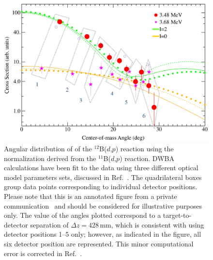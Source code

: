 \begin{figure}[p]
\centering
\includegraphics[height=0.4\textheight,width=\columnwidth,keepaspectratio]{../More_Figures/b13.eps}%
\caption[Angular distribution of of the $^{12}$B($d$,$p$) reaction]{Angular distribution of of the $^{12}$B($d$,$p$) reaction using the normalization derived from the $^{11}$B($d$,$p$) reaction.  DWBA calculations have been fit to the data using three different optical model parameters sets, discussed in Ref.~\cite{Schiffer_2010}. The quadrilateral boxes group data points corresponding to individual detector positions.  Please note that this is an annotated figure from a private communication~\cite{Schiffer_2009PC} and should be considered for illustrative purposes only.  The value of the angles plotted correspond to a target-to-detector separation of $\Delta z = 428$\,mm, which is consistent with using detector positions 1--5 only; however, as indicated in the figure, all six detector position are represented. This minor computational error is corrected in Ref.~\cite{Schiffer_2010}.
}%
\label{b13angdist}%
\end{figure}
